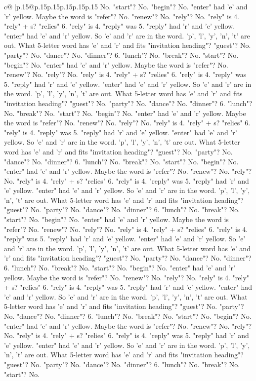 \documentclass{article}
\begin{document}
{\begin{supertabular}{c@{$\;$}|p{.15\linewidth}@{}p{.15\linewidth}p{.15\linewidth}p{.15\linewidth}p{.15\linewidth}p{.15\linewidth}}
{{{No. "start"? No. "begin"? No. "enter" had 'e' and 'r' yellow. Maybe the word is "refer"? No. "renew"? No. "rely"? No. "rely" is 4. "rely" + s? "relies" 6. "rely" is 4. "reply" was 5. "reply" had 'r' and 'e' yellow. "enter" had 'e' and 'r' yellow. So 'e' and 'r' are in the word. 'p', 'l', 'y', 'n', 't' are out. What 5{-}letter word has 'e' and 'r' and fits "invitation heading"? "guest"? No. "party"? No. "dance"? No. "dinner"? 6. "lunch"? No. "break"? No. "start"? No. "begin"? No. "enter" had 'e' and 'r' yellow. Maybe the word is "refer"? No. "renew"? No. "rely"? No. "rely" is 4. "rely" + s? "relies" 6. "rely" is 4. "reply" was 5. "reply" had 'r' and 'e' yellow. "enter" had 'e' and 'r' yellow. So 'e' and 'r' are in the word. 'p', 'l', 'y', 'n', 't' are out. What 5{-}letter word has 'e' and 'r' and fits "invitation heading"? "guest"? No. "party"? No. "dance"? No. "dinner"? 6. "lunch"? No. "break"? No. "start"? No. "begin"? No. "enter" had 'e' and 'r' yellow. Maybe the word is "refer"? No. "renew"? No. "rely"? No. "rely" is 4. "rely" + s? "relies" 6. "rely" is 4. "reply" was 5. "reply" had 'r' and 'e' yellow. "enter" had 'e' and 'r' yellow. So 'e' and 'r' are in the word. 'p', 'l', 'y', 'n', 't' are out. What 5{-}letter word has 'e' and 'r' and fits "invitation heading"? "guest"? No. "party"? No. "dance"? No. "dinner"? 6. "lunch"? No. "break"? No. "start"? No. "begin"? No. "enter" had 'e' and 'r' yellow. Maybe the word is "refer"? No. "renew"? No. "rely"? No. "rely" is 4. "rely" + s? "relies" 6. "rely" is 4. "reply" was 5. "reply" had 'r' and 'e' yellow. "enter" had 'e' and 'r' yellow. So 'e' and 'r' are in the word. 'p', 'l', 'y', 'n', 't' are out. What 5{-}letter word has 'e' and 'r' and fits "invitation heading"? "guest"? No. "party"? No. "dance"? No. "dinner"? 6. "lunch"? No. "break"? No. "start"? No. "begin"? No. "enter" had 'e' and 'r' yellow. Maybe the word is "refer"? No. "renew"? No. "rely"? No. "rely" is 4. "rely" + s? "relies" 6. "rely" is 4. "reply" was 5. "reply" had 'r' and 'e' yellow. "enter" had 'e' and 'r' yellow. So 'e' and 'r' are in the word. 'p', 'l', 'y', 'n', 't' are out. What 5{-}letter word has 'e' and 'r' and fits "invitation heading"? "guest"? No. "party"? No. "dance"? No. "dinner"? 6. "lunch"? No. "break"? No. "start"? No. "begin"? No. "enter" had 'e' and 'r' yellow. Maybe the word is "refer"? No. "renew"? No. "rely"? No. "rely" is 4. "rely" + s? "relies" 6. "rely" is 4. "reply" was 5. "reply" had 'r' and 'e' yellow. "enter" had 'e' and 'r' yellow. So 'e' and 'r' are in the word. 'p', 'l', 'y', 'n', 't' are out. What 5{-}letter word has 'e' and 'r' and fits "invitation heading"? "guest"? No. "party"? No. "dance"? No. "dinner"? 6. "lunch"? No. "break"? No. "start"? No. "begin"? No. "enter" had 'e' and 'r' yellow. Maybe the word is "refer"? No. "renew"? No. "rely"? No. "rely" is 4. "rely" + s? "relies" 6. "rely" is 4. "reply" was 5. "reply" had 'r' and 'e' yellow. "enter" had 'e' and 'r' yellow. So 'e' and 'r' are in the word. 'p', 'l', 'y', 'n', 't' are out. What 5{-}letter word has 'e' and 'r' and fits "invitation heading"? "guest"? No. "party"? No. "dance"? No. "dinner"? 6. "lunch"? No. "break"? No. "start"? No. }}}
\end{supertabular}}
\end{document}
